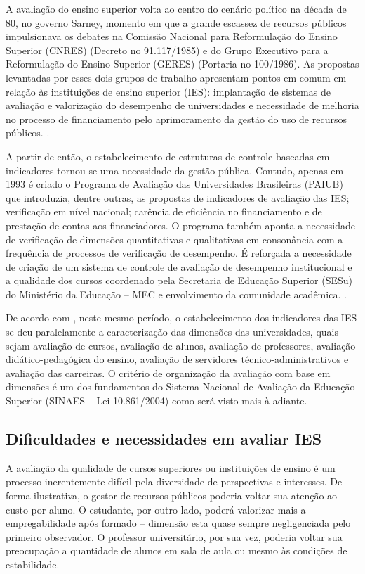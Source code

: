 	A avaliação do ensino superior volta ao centro do cenário político na década de 80, no governo Sarney, momento em que a grande escassez de recursos públicos impulsionava os debates na Comissão Nacional para Reformulação do Ensino Superior (CNRES) (Decreto no 91.117/1985) e do Grupo Executivo para a Reformulação do Ensino Superior (GERES) (Portaria no 100/1986). As propostas levantadas por esses dois grupos de trabalho apresentam pontos em comum em relação às instituições de ensino superior (IES): implantação de sistemas de avaliação e valorização do desempenho de universidades e necessidade de melhoria no processo de financiamento pelo aprimoramento da gestão do uso de recursos públicos. \cite[p.~321]{Barbosa_Freire_Crisostomo_2011}.

	A partir de então, o estabelecimento de estruturas de controle baseadas em indicadores tornou-se uma necessidade da gestão pública. Contudo, apenas em 1993 é criado o Programa de Avaliação das Universidades Brasileiras (PAIUB) que introduzia, dentre outras, as propostas de indicadores de avaliação das IES; verificação em nível nacional; carência de eficiência no financiamento e de prestação de contas aos financiadores. O programa também aponta a necessidade de verificação de dimensões quantitativas e qualitativas em consonância com a frequência de processos de verificação de desempenho. É reforçada a necessidade de criação de um sistema de controle de avaliação de desempenho institucional e a qualidade dos cursos coordenado pela Secretaria de Educação Superior (SESu) do Ministério da Educação – MEC e envolvimento da comunidade acadêmica. .

	De acordo com , neste mesmo período, o estabelecimento dos indicadores das IES se deu paralelamente a caracterização das dimensões das universidades, quais sejam avaliação de cursos, avaliação de alunos, avaliação de professores, avaliação didático-pedagógica do ensino, avaliação de servidores técnico-administrativos e avaliação das carreiras. O critério de organização da avaliação com base em dimensões é um dos fundamentos do Sistema Nacional de Avaliação da Educação Superior (SINAES – Lei 10.861/2004) como será visto mais à adiante.

\subsection{Dificuldades e necessidades em avaliar IES}
A avaliação da qualidade de cursos superiores ou instituições de ensino é um processo inerentemente difícil pela diversidade de perspectivas e interesses. De forma ilustrativa, o gestor de recursos públicos poderia voltar sua atenção ao custo por aluno. O estudante, por outro lado, poderá valorizar mais a empregabilidade após formado -- dimensão esta quase sempre negligenciada pelo primeiro observador. O professor universitário, por sua vez, poderia voltar sua preocupação a quantidade de alunos em sala de aula ou mesmo às condições de estabilidade. 

